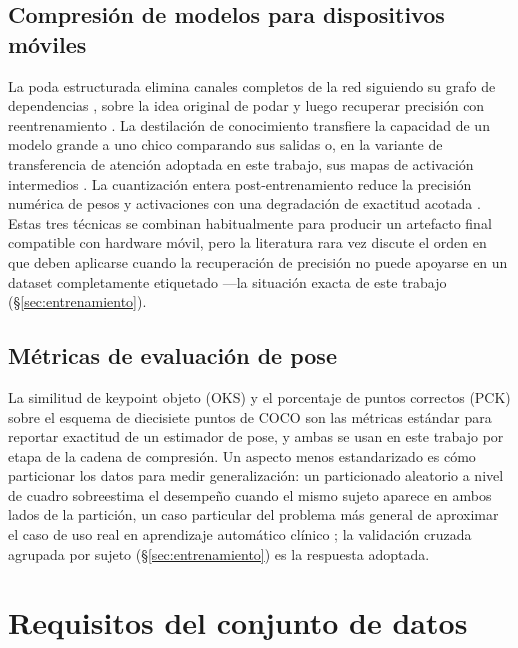 \documentclass[10pt,a4paper,twocolumn]{article}
\begin{document}
\subsection{Compresión de modelos para dispositivos móviles}
La poda estructurada elimina canales completos de la red siguiendo su grafo
de dependencias \cite{fang2023}, sobre la idea original de podar y luego
recuperar precisión con reentrenamiento \cite{han2015}. La destilación de
conocimiento transfiere la capacidad de un modelo grande a uno chico
comparando sus salidas \cite{hinton2015} o, en la variante de transferencia
de atención adoptada en este trabajo, sus mapas de activación intermedios
\cite{zagoruyko2017}. La cuantización entera post-entrenamiento reduce la
precisión numérica de pesos y activaciones con una degradación de exactitud
acotada \cite{jacob2018}. Estas tres técnicas se combinan habitualmente para
producir un artefacto final compatible con hardware móvil, pero la
literatura rara vez discute el orden en que deben aplicarse cuando la
recuperación de precisión no puede apoyarse en un dataset completamente
etiquetado ---la situación exacta de este trabajo (\S\ref{sec:entrenamiento}).

\subsection{Métricas de evaluación de pose}
La similitud de keypoint objeto (OKS) y el porcentaje de puntos correctos
(PCK) sobre el esquema de diecisiete puntos de COCO \cite{lin2014} son las
métricas estándar para reportar exactitud de un estimador de pose, y ambas se
usan en este trabajo por etapa de la cadena de compresión. Un aspecto menos
estandarizado es cómo particionar los datos para medir generalización: un
particionado aleatorio a nivel de cuadro sobreestima el desempeño cuando el
mismo sujeto aparece en ambos lados de la partición, un caso particular del
problema más general de aproximar el caso de uso real en aprendizaje
automático clínico \cite{saeb2017}; la validación cruzada agrupada por
sujeto (\S\ref{sec:entrenamiento}) es la respuesta adoptada.

\section{Requisitos del conjunto de datos}
\label{sec:requisitos}
\end{document}
